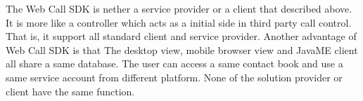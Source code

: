 The Web Call SDK is nether a service provider or a client that described above. It is more like a controller which acts as a initial side in third party call control. That is, it support all standard client and service provider. Another advantage of Web Call SDK is that The desktop view, mobile browser view and JavaME client all share a same database. The user can access a same contact book and use a same service account from different platform. None of the solution provider or client have the same function.







